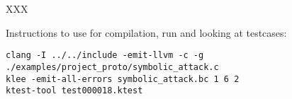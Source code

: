 \documentclass[11pt,a4paper,notitlepage]{article}
\begin{document}
XXX

Instructions to use for compilation, run and looking at testcases:
\begin{verbatim}
clang -I ../../include -emit-llvm -c -g ./examples/project_proto/symbolic_attack.c
klee -emit-all-errors symbolic_attack.bc 1 6 2
ktest-tool test000018.ktest
\end{verbatim}

\newpage




\end{document}

